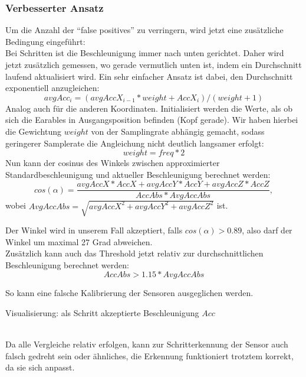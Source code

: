 \documentclass[a4paper,12pt]{article}
\begin{document}
\subsubsection{Verbesserter Ansatz}
Um die Anzahl der ``false positives'' zu verringern, wird jetzt eine zusätzliche Bedingung eingeführt:\\
Bei Schritten ist die Beschleunigung immer nach unten gerichtet. Daher wird jetzt zusätzlich gemessen, wo gerade vermutlich unten ist, indem ein Durchschnitt laufend aktualisiert wird. Ein sehr einfacher Ansatz ist dabei, den Durchschnitt exponentiell anzugleichen:
\begin{equation}
	avgAcc_i = (avgAccX_{i-1} * weight + AccX_i) /(weight + 1)
\end{equation}
Analog auch für die anderen Koordinaten. Initialisiert werden die Werte, als ob sich die Earables in Ausgangsposition befinden (Kopf gerade). Wir haben hierbei die Gewichtung $weight$ von der Samplingrate abhängig gemacht, sodass geringerer Samplerate die Angleichung nicht deutlich langsamer erfolgt:
\begin{equation}
	weight = freq * 2
\end{equation}
Nun kann der cosinus des Winkels zwischen approximierter Standardbeschleunigung und aktueller Beschleunigung berechnet werden:
\begin{equation}
	cos(\alpha) = \frac{avgAccX * AccX + avgAccY * AccY + avgAccZ * AccZ}{ AccAbs * AvgAccAbs },
\end{equation}
wobei $AvgAccAbs = \sqrt{avgAccX^2+avgAccY^2+avgAccZ^2}$ ist.\\
\newline
\noindent
\begin{minipage}{0.5\textwidth}
	Der Winkel wird in unserem Fall akzeptiert, falls $cos(\alpha) > 0.89$, also darf der Winkel um maximal 27 Grad abweichen.\\
	
	Zusätzlich kann auch das Threshold jetzt relativ zur durchschnittlichen Beschleunigung berechnet werden:
	\begin{equation}
		AccAbs > 1.15 * AvgAccAbs
	\end{equation}
	
	So kann eine falsche Kalibrierung der Sensoren ausgeglichen werden.
\end{minipage}
\hspace{0.1\textwidth}
\begin{minipage}{0.35\textwidth}
	
	Visualisierung: als Schritt akzeptierte Beschleunigung $Acc$
\end{minipage}
\vspace{0.5cm}\\
Da alle Vergleiche relativ erfolgen, kann zur Schritterkennung der Sensor auch falsch gedreht sein oder ähnliches, die Erkennung funktioniert trotztem korrekt, da sie sich anpasst.\\
\end{document}
